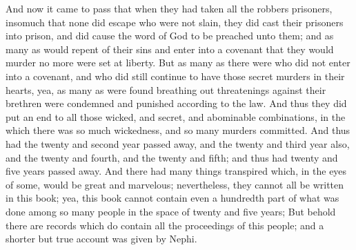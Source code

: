 And now it came to pass that when they had taken all the robbers prisoners, insomuch that none did escape who were not slain, they did cast their prisoners into prison, and did cause the word of God to be preached unto them; and as many as would repent of their sins and enter into a covenant that they would murder no more were set at liberty.
\bverse \iffalse But as many as there were who did not enter into a covenant, and who did still continue to have those secret murders in their hearts, yea, as many as were found breathing out threatenings against their brethren were condemned and punished according to the law. \fi
But as many as there were who did not enter into a covenant, and who did still continue to have those secret murders in their hearts, yea, as many as were found breathing out threatenings against their brethren were condemned and punished according to the law.
\bverse \iffalse And thus they did put an end to all those wicked, and secret, and abominable combinations, in the which there was so much wickedness, and so many murders committed. \fi
And thus they did put an end to all those wicked, and secret, and abominable combinations, in the which there was so much wickedness, and so many murders committed.
\bverse \iffalse And thus had the twenty and second year passed away, and the twenty and third year also, and the twenty and fourth, and the twenty and fifth; and thus had twenty and five years passed away. \fi
And thus had the twenty and second year passed away, and the twenty and third year also, and the twenty and fourth, and the twenty and fifth; and thus had twenty and five years passed away.
\bverse \iffalse And there had many things transpired which, in the eyes of some, would be great and marvelous; nevertheless, they cannot all be written in this book; yea, this book cannot contain even a hundredth part of what was done among so many people in the space of twenty and five years; \fi
And there had many things transpired which, in the eyes of some, would be great and marvelous; nevertheless, they cannot all be written in this book; yea, this book cannot contain even a hundredth part of what was done among so many people in the space of twenty and five years;
\bverse \iffalse But behold there are records which do contain all the proceedings of this people; and a shorter but true account was given by Nephi. \fi
But behold there are records which do contain all the proceedings of this people; and a shorter but true account was given by Nephi.
\bverse \iffalse Therefore I have made my record of these things according to the record of Nephi, which was engraven on the plates which were called the plates of Nephi. \fi
